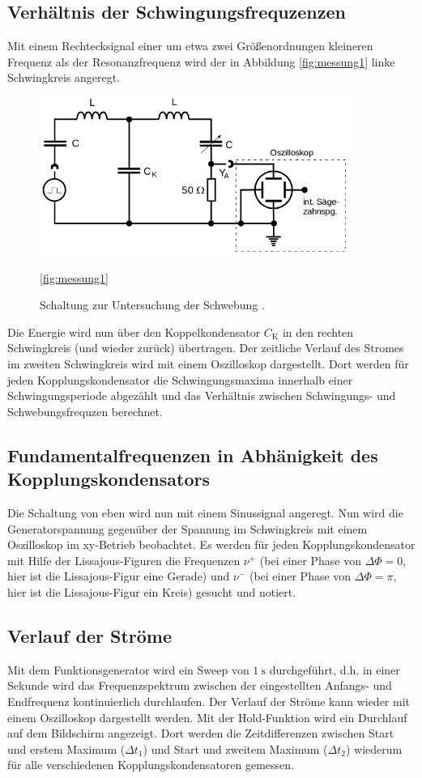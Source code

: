 \subsection{Verhältnis der Schwingungsfrequzenzen}
Mit einem Rechtecksignal einer um etwa zwei Größenordnungen kleineren Frequenz
als der Resonanzfrequenz wird der in Abbildung \ref{fig:messung1} linke Schwingkreis
angeregt.
\begin{figure}
  \centering
  \includegraphics[width=0.9\textwidth]{messung1.png}
  \caption{Schaltung zur Untersuchung der Schwebung \cite{sample}.}
  \ref{fig:messung1}
\end{figure}
Die Energie wird nun über den Koppelkondensator $C_\text{K}$ in den
rechten Schwingkreis (und wieder zurück) übertragen. Der zeitliche Verlauf des
Stromes im zweiten Schwingkreis wird mit einem Oszilloskop dargestellt. Dort
werden für jeden Kopplungskondensator die Schwingungsmaxima innerhalb einer
Schwingungsperiode abgezählt und das Verhältnis zwischen Schwingungs- und
Schwebungsfrequzen berechnet.

\subsection{Fundamentalfrequenzen in Abhänigkeit des Kopplungskondensators}
Die Schaltung von eben wird nun mit einem Sinussignal angeregt. Nun wird die
Generatorspannung gegenüber der Spannung im Schwingkreis mit einem Oszilloskop
im xy-Betrieb beobachtet. Es werden für jeden Kopplungskondensator mit Hilfe
der Lissajous-Figuren die Frequenzen $\nu^{+}$ (bei einer Phase von $\Delta \Phi = 0$,
hier ist die Lissajous-Figur eine Gerade) und $\nu^{-}$ (bei einer Phase von
$\Delta \Phi = \pi$, hier ist die Lissajous-Figur ein Kreis) gesucht und notiert.

\subsection{Verlauf der Ströme}
Mit dem Funktionsgenerator wird ein Sweep von $\SI{1}{\second}$ durchgeführt,
d.h. in einer Sekunde wird das Frequenzspektrum zwischen der eingestellten
Anfangs- und Endfrequenz kontinuierlich durchlaufen. Der Verlauf der Ströme kann
wieder mit einem Oszilloskop dargestellt werden. Mit der Hold-Funktion wird ein
Durchlauf auf dem Bildschirm angezeigt. Dort werden die Zeitdifferenzen zwischen
Start und erstem Maximum ($\Delta t_1$) und Start und zweitem Maximum ($\Delta t_2$)
wiederum für alle verschiedenen Kopplungskondensatoren gemessen.
